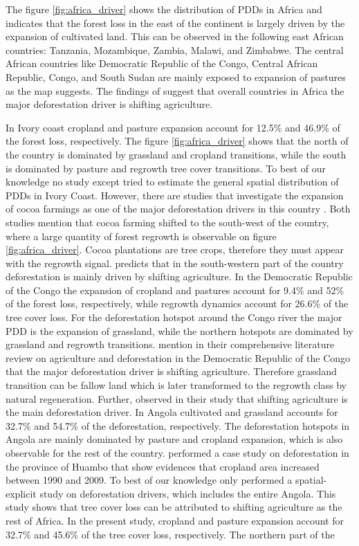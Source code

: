 			The figure \ref{fig:africa_driver} shows the distribution of \acp{PDD} in Africa and indicates that the forest loss in the east of the continent is largely driven by the expansion of cultivated land. This can be observed in the following east African countries: Tanzania, Mozambique, Zambia, Malawi, and Zimbabwe. The central African countries like Democratic Republic of the Congo, Central African Republic, Congo, and South Sudan are mainly exposed to expansion of pastures as the map suggests. The findings of \citet{Curtis2018} suggest that overall countries in Africa the major deforestation driver is shifting agriculture. 

			In Ivory coast cropland and pasture expansion account for 12.5\% and 46.9\% of the forest loss, respectively. The figure \ref{fig:africa_driver} shows that the north of the country is dominated by grassland and cropland transitions, while the south is dominated by pasture and regrowth tree cover transitions. To best of our knowledge no study except \citet{Curtis2018} tried to estimate the general spatial distribution of \acp{PDD} in Ivory Coast. However, there are studies that investigate the expansion of cocoa farmings as one of the major deforestation drivers in this country \citep{Barima2016,Ruf2014}. Both studies mention that cocoa farming shifted to the south-west of the country, where a large quantity of forest regrowth is observable on figure \ref{fig:africa_driver}. Cocoa plantations are tree crops, therefore they must appear with the regrowth signal. \citet{Curtis2018} predicts that in the south-western part of the country deforestation is mainly driven by shifting agriculture. In the Democratic Republic of the Congo the expansion of cropland and pastures account for 9.4\% and 52\% of the forest loss, respectively, while regrowth dynamics account for 26.6\% of the tree cover loss. For the deforestation hotspot around the Congo river the major \ac{PDD} is the expansion of grassland, while the northern hotspots are dominated by grassland and regrowth transitions. \citet{Ickowitz2015} mention in their comprehensive literature review on agriculture and deforestation in the Democratic Republic of the Congo that the major deforestation driver is shifting agriculture. Therefore grassland transition can be fallow land which is later transformed to the regrowth class by natural regeneration. Further, \citet{Curtis2018} observed in their study that shifting agriculture is the main deforestation driver. In Angola cultivated and grassland accounts for 32.7\% and 54.7\% of the deforestation, respectively. The deforestation hotspots in Angola are mainly dominated by pasture and cropland expansion, which is also observable for the rest of the country. \citet{Cabral2011} performed a case study on deforestation in the province of Huambo that show evidences that cropland area increased between 1990 and 2009. To best of our knowledge only \citet{Curtis2018} performed a spatial-explicit study on deforestation drivers, which includes the entire Angola. This study shows that tree cover loss can be attributed to shifting agriculture as the rest of Africa. In the present study, cropland and pasture expansion account for 32.7\% and 45.6\% of the tree cover loss, respectively. The northern part of the 